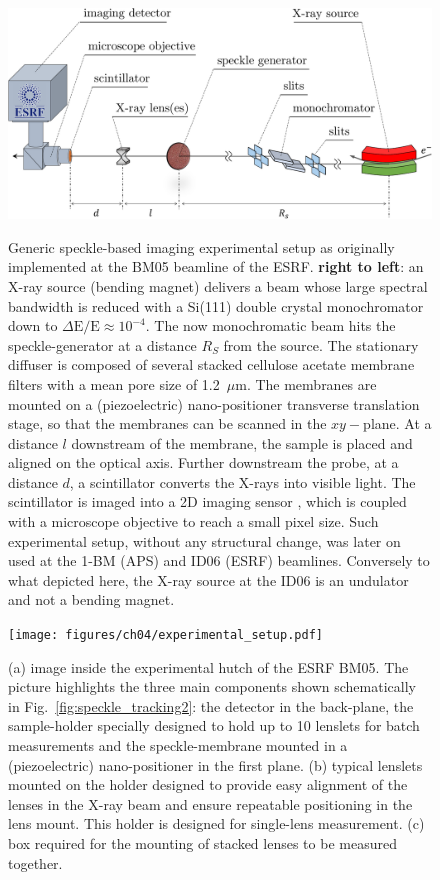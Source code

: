 \begin{refsection}
\begin{figure}[t]
        \centering
        {\includegraphics[width=0.75\linewidth]{figures/ch04/BM05.pdf}}
        \caption[Speckle-based imaging experimental setup at the BM05 beamline, ESRF.]{Generic speckle-based imaging experimental setup as originally implemented at the BM05 beamline of the ESRF. \textbf{right to left}: an X-ray source (bending magnet) delivers a beam whose large spectral bandwidth is reduced with a Si(111) double crystal monochromator down to $\Delta \text{E}/\text{E}\approx10^{-4}$. The now monochromatic beam hits the speckle-generator at a distance $R_S$ from the source. The stationary diffuser is composed of several stacked cellulose acetate membrane filters with a mean pore size of 1.2~$\mu$m. The membranes are mounted on a (piezoelectric) nano-positioner transverse translation stage, so that the membranes can be scanned in the $xy-$plane. At a distance $l$ downstream of the membrane, the sample is placed and aligned on the optical axis. Further downstream the probe, at a distance $d$, a scintillator converts the X-rays into visible light. The scintillator is imaged into a 2D imaging sensor , which is coupled with a microscope objective to reach a small pixel size. Such experimental setup, without any structural change, was later on used at the 1-BM (APS) and ID06 (ESRF) beamlines. Conversely to what depicted here, the X-ray source at the ID06 is an undulator and not a bending magnet.} \label{fig:BM05}
\end{figure}

\begin{figure}[t]
        \centering
        {\texttt{[image: figures/ch04/experimental\_setup.pdf]}}
        \caption[Experimental setup at the BM05 beamline, ESRF.]{(a) image inside the experimental hutch of the ESRF BM05. The picture highlights the three main components shown schematically in Fig.~\ref{fig:speckle_tracking2}: the detector in the back-plane, the sample-holder specially designed to hold up to 10 lenslets for batch measurements and the speckle-membrane mounted in a (piezoelectric) nano-positioner in the first plane. (b) typical lenslets mounted on the holder designed to provide easy alignment of the lenses in the X-ray beam and ensure repeatable positioning in the lens mount. This holder is designed for single-lens measurement. (c) box required for the  mounting of stacked lenses to be measured together.} \label{fig:experimental_setup}
\end{figure}


\end{refsection}
